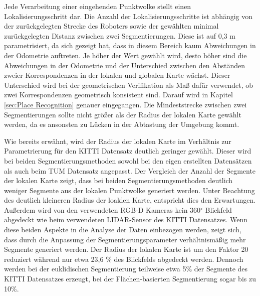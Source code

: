 Jede Verarbeitung einer eingehenden Punktwolke stellt einen Lokalisierungsschritt dar. Die Anzahl der Lokalisierungsschritte ist abhängig von der zurückgelegten Strecke des Roboters sowie der gewählten minimal zurückgelegten Distanz zwischen zwei Segmentierungen. Diese ist auf 0,3 m parametrisiert, da sich gezeigt hat, dass in diesem Bereich kaum Abweichungen in der Odometrie auftreten. Je höher der Wert gewählt wird, desto höher sind die Abweichungen in der Odometrie und der Unterschied zwischen den Abständen zweier Korrespondenzen in der lokalen und globalen Karte wächst. Dieser Unterschied wird bei der geometrischen Verifikation als Maß dafür verwendet, ob zwei Korrespondenzen geometrisch konsistent sind. Darauf wird in Kapitel \ref{sec:Place Recognition} genauer eingegangen. Die Mindeststrecke zwischen zwei Segmentierungen sollte nicht größer als der Radius der lokalen Karte gewählt werden, da es ansonsten zu Lücken in der Abtastung der Umgebung kommt.  

Wie bereits erwähnt, wird der Radius der lokalen Karte im Verhältnis zur Parametrierung für den KITTI Datensatz deutlich geringer gewählt. Dieser wird bei beiden  Segmentierungsmethoden sowohl bei den eigen erstellten Datensätzen als auch beim TUM Datensatz angepasst. Der Vergleich der Anzahl der Segmente der lokalen Karte zeigt, dass bei beiden Segmentierungsmethoden deutlich weniger Segmente aus der lokalen Punktwolke  generiert werden. Unter Beachtung des deutlich kleineren Radius der loaklen Karte, entspricht dies den Erwartungen. Außerdem wird von den verwendeten RGB-D Kameras kein 360$ ^\circ $ Blickfeld abgedeckt wie beim verwendeten LIDAR-Sensor des KITTI Datensatzes. Wenn diese beiden Aspekte in die Analyse der Daten einbezogen werden, zeigt sich, dass durch die Anpassung der Segmentierungsparameter verhältnismäßig mehr Segmente generiert werden. Der Radius der lokalen Karte ist um den Faktor 20 reduziert während nur etwa 23,6 $\%$ des Blickfelds abgedeckt werden. Dennoch werden bei der euklidischen Segmentierung teilweise etwa 5$\%$ der Segmente des KITTI Datensatzes erzeugt, bei der Flächen-basierten Segmentierung sogar bis zu 10$\%$.

 
